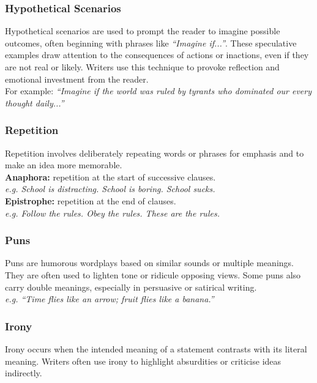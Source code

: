 \documentclass[a4paper]{article}
\begin{document}
\subsubsection{Hypothetical Scenarios}
Hypothetical scenarios are used to prompt the reader to imagine possible outcomes, often beginning with phrases like \textit{“Imagine if...”}. These speculative examples draw attention to the consequences of actions or inactions, even if they are not real or likely. Writers use this technique to provoke reflection and emotional investment from the reader.\\

For example: \textit{“Imagine if the world was ruled by tyrants who dominated our every thought daily...”}\\

\subsubsection{Repetition}
Repetition involves deliberately repeating words or phrases for emphasis and to make an idea more memorable.\\

\textbf{Anaphora:} repetition at the start of successive clauses.\\
\textit{e.g. School is distracting. School is boring. School sucks.}\\
\textbf{Epistrophe:} repetition at the end of clauses.\\
\textit{e.g. Follow the rules. Obey the rules. These are the rules.}\\

\subsubsection{Puns}
Puns are humorous wordplays based on similar sounds or multiple meanings. They are often used to lighten tone or ridicule opposing views. Some puns also carry double meanings, especially in persuasive or satirical writing.\\

\textit{e.g. “Time flies like an arrow; fruit flies like a banana.”}\\

\subsubsection{Irony}
Irony occurs when the intended meaning of a statement contrasts with its literal meaning. Writers often use irony to highlight absurdities or criticise ideas indirectly.\\
\end{document}
